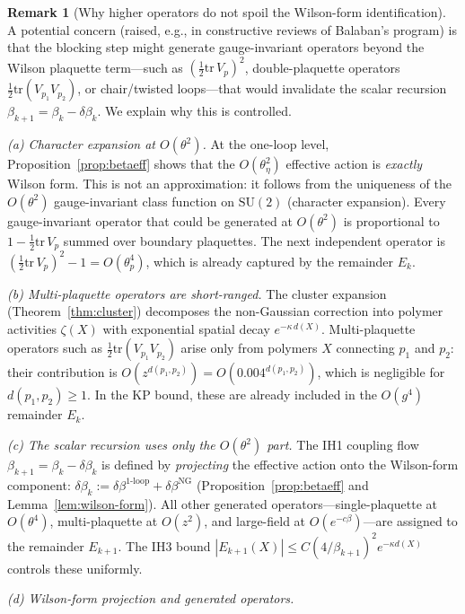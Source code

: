 \documentclass[11pt]{article}
\theoremstyle{definition}
\newtheorem{remark}[theorem]{Remark}
\newcommand{\SU}{\mathrm{SU}}
\newcommand{\tr}{\mathrm{tr}}
\begin{document}
\begin{remark}[Why higher operators do not spoil the Wilson-form identification]%
\label{rem:operator-classification}
A potential concern (raised, e.g., in constructive reviews of
Balaban's program) is that the blocking step might generate
gauge-invariant operators beyond the Wilson plaquette term---such as
$(\frac{1}{2}\tr\,V_p)^2$, double-plaquette operators
$\frac{1}{2}\tr(V_{p_1}V_{p_2})$, or chair/twisted loops---that would
invalidate the scalar recursion $\beta_{k+1}=\beta_k-\delta\beta_k$.
We explain why this is controlled.

\emph{(a) Character expansion at $O(\theta^2)$.}
At the one-loop level, Proposition~\ref{prop:betaeff} shows that
the $O(\theta_\eta^2)$ effective action is \emph{exactly} Wilson
form.  This is not an approximation: it follows from the uniqueness
of the $O(\theta^2)$ gauge-invariant class function on $\SU(2)$
(character expansion).  Every gauge-invariant operator that could be
generated at $O(\theta^2)$ is proportional to $1-\frac{1}{2}\tr\,V_p$
summed over boundary plaquettes.  The next independent operator
is $(\frac{1}{2}\tr\,V_p)^2-1=O(\theta_p^4)$, which is already
captured by the remainder $E_k$.

\emph{(b) Multi-plaquette operators are short-ranged.}
The cluster expansion (Theorem~\ref{thm:cluster}) decomposes the
non-Gaussian correction into polymer activities $\zeta(X)$ with
exponential spatial decay $e^{-\kappa\,d(X)}$.  Multi-plaquette
operators such as $\frac{1}{2}\tr(V_{p_1}V_{p_2})$ arise only from
polymers $X$ connecting $p_1$ and $p_2$: their contribution is
$O(z^{d(p_1,p_2)})=O(0.004^{d(p_1,p_2)})$, which is negligible
for $d(p_1,p_2)\ge 1$.  In the KP bound, these are already
included in the $O(g^4)$ remainder $E_k$.

\emph{(c) The scalar recursion uses only the $O(\theta^2)$ part.}
The IH1 coupling flow $\beta_{k+1}=\beta_k-\delta\beta_k$ is defined
by \emph{projecting} the effective action onto the Wilson-form
component:
$\delta\beta_k:=\delta\beta^{1\text{-loop}}
+\delta\beta^{\mathrm{NG}}$
(Proposition~\ref{prop:betaeff} and Lemma~\ref{lem:wilson-form}).
All other generated operators---single-plaquette at
$O(\theta^4)$, multi-plaquette at $O(z^2)$, and
large-field at $O(e^{-c\beta})$---are assigned to the remainder
$E_{k+1}$.  The IH3 bound $|E_{k+1}(X)|\le C(4/\beta_{k+1})^2
e^{-\kappa d(X)}$ controls these uniformly.

\emph{(d) Wilson-form projection and generated operators.}


\end{remark}
\end{document}
